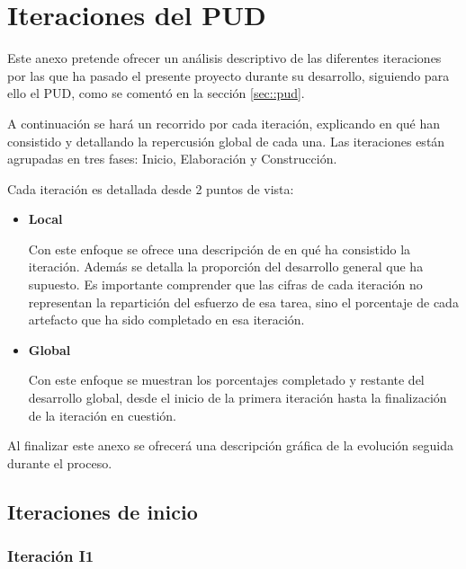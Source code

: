 \chapter{Iteraciones del PUD}
\label{chap::iteraciones}

Este anexo pretende ofrecer un análisis descriptivo de las diferentes iteraciones por las que ha pasado el presente proyecto durante su desarrollo, siguiendo para ello el \acs{PUD}, como se comentó en la sección \ref{sec::pud}.

A continuación se hará un recorrido por cada iteración, explicando en qué han consistido y detallando la repercusión global de cada una. Las iteraciones están agrupadas en tres fases: Inicio, Elaboración y Construcción.

Cada iteración es detallada desde 2 puntos de vista:

\begin{itemize}
\item {\bf Local}

Con este enfoque se ofrece una descripción de en qué ha consistido la iteración. Además se detalla la proporción del desarrollo general que ha supuesto. Es importante comprender que las cifras de cada iteración no representan la repartición del esfuerzo de esa tarea, sino el porcentaje de cada artefacto que ha sido completado en esa iteración.

\item {\bf Global}

Con este enfoque se muestran los porcentajes completado y restante del desarrollo global, desde el inicio de la primera iteración hasta la finalización de la iteración en cuestión.

\end{itemize}

Al finalizar este anexo se ofrecerá una descripción gráfica de la evolución seguida durante el proceso.

\section{Iteraciones de inicio}


\subsection*{Iteración I1}

